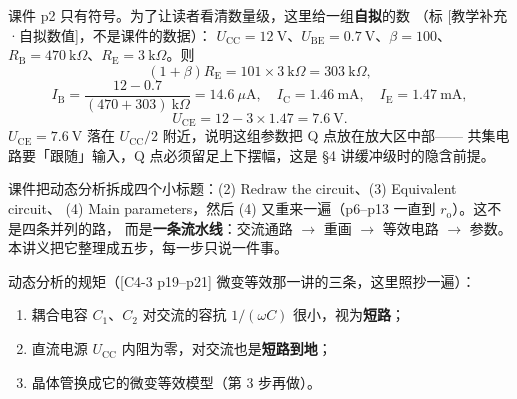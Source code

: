 \documentclass[11pt]{ctexart}
\begin{document}


课件 p2 只有符号。为了让读者看清数量级，这里给一组\textbf{自拟}的数
（标 [教学补充·自拟数值]，不是课件的数据）：
$U_{\mathrm{CC}}=12\ \mathrm{V}$、$U_{\mathrm{BE}}=0.7\ \mathrm{V}$、$\beta=100$、
$R_{\mathrm{B}}=470\ \mathrm{k}\Omega$、$R_{\mathrm{E}}=3\ \mathrm{k}\Omega$。则
\[
(1+\beta)R_{\mathrm{E}}=101\times3\ \mathrm{k}\Omega=303\ \mathrm{k}\Omega,
\]
\[
I_{\mathrm{B}}=\frac{12-0.7}{(470+303)\ \mathrm{k}\Omega}=14.6\ \mu\mathrm{A},\quad
I_{\mathrm{C}}=1.46\ \mathrm{mA},\quad I_{\mathrm{E}}=1.47\ \mathrm{mA},
\]
\[
U_{\mathrm{CE}}=12-3\times1.47=7.6\ \mathrm{V}.
\]
$U_{\mathrm{CE}}=7.6\ \mathrm{V}$ 落在 $U_{\mathrm{CC}}/2$ 附近，说明这组参数把 Q 点放在放大区中部——
共集电路要「跟随」输入，Q 点必须留足上下摆幅，这是 §4 讲缓冲级时的隐含前提。




课件把动态分析拆成四个小标题：(2) Redraw the circuit、(3) Equivalent circuit、
(4) Main parameters，然后 (4) 又重来一遍（p6--p13 一直到 $r_{\mathrm{o}}$）。这不是四条并列的路，
而是\textbf{一条流水线}：交流通路 $\to$ 重画 $\to$ 等效电路 $\to$ 参数。
本讲义把它整理成五步，每一步只说一件事。


动态分析的规矩（[C4-3 p19--p21] 微变等效那一讲的三条，这里照抄一遍）：
\begin{enumerate}
\item 耦合电容 $C_1$、$C_2$ 对交流的容抗 $1/(\omega C)$ 很小，视为\textbf{短路}；
\item 直流电源 $U_{\mathrm{CC}}$ 内阻为零，对交流也是\textbf{短路到地}；
\item 晶体管换成它的微变等效模型（第 3 步再做）。
\end{enumerate}
\end{document}
